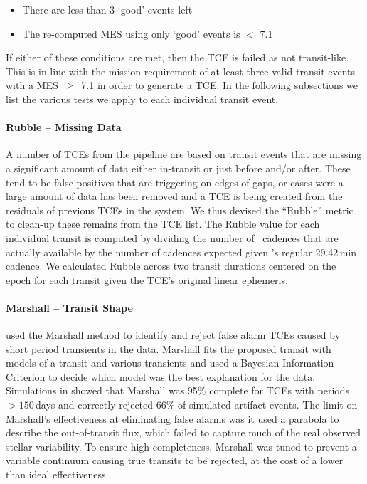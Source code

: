 \begin{itemize}
\item There are less than 3 `good' events left
\item The re-computed MES using only `good' events is $<$ 7.1
\end{itemize}

\noindent If either of these conditions are met, then the TCE is failed as not transit-like. This is in line with the \kepler{} mission requirement of at least three valid transit events with a MES~$\ge$~7.1 in order to generate a TCE. In the following subsections we list the various tests we apply to each individual transit event.


\paragraph{Rubble -- Missing Data}
\label{s:rubble}
A number of TCEs from the \kepler{} pipeline are based on transit events that are missing a significant amount of data either in-transit or just before and/or after. These tend to be false positives that are triggering on edges of gaps, or cases were a large amount of data has been removed and a TCE is being created from the residuals of previous TCEs in the system. We thus devised the ``Rubble'' metric to clean-up these remains from the TCE list. The Rubble value for each individual transit is computed by dividing the number of \Kepler\ cadences that are actually available by the number of cadences expected given \Kepler's regular 29.42\,min cadence.  We calculated Rubble across two transit durations centered on the epoch for each transit given the TCE's original linear ephemeris. 


\paragraph{Marshall -- Transit Shape}
\label{s:marshall}
\citet{Coughlin2016} used the Marshall method \citep{Mullally2016} to identify and reject false alarm TCEs caused by short period transients in the data. Marshall fits the proposed transit with models of a transit and various transients and used a Bayesian Information Criterion to decide which model was the best explanation for the data. Simulations in \citet{Mullally2016} showed that Marshall was 95\% complete for TCEs with periods $>150$\,days and correctly rejected 66\% of simulated artifact events. The limit on Marshall's effectiveness at eliminating false alarms was it used a parabola to describe the out-of-transit flux, which failed to capture much of the real observed stellar variability. To ensure high completeness, Marshall was tuned to prevent a variable continuum causing true transits to be rejected, at the cost of a lower than ideal effectiveness.

